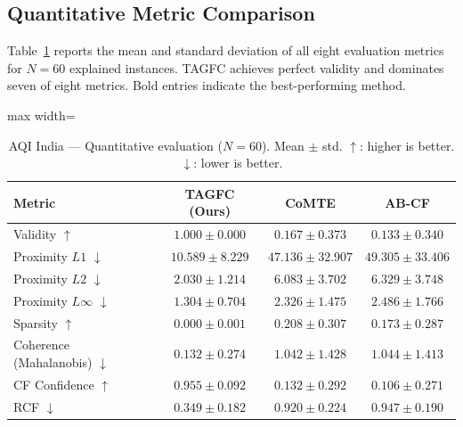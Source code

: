 \subsection{Quantitative Metric Comparison}

Table~\ref{tab:aqi_results} reports the mean and standard deviation of all eight evaluation metrics for $N=60$ explained instances. TAGFC achieves perfect validity and dominates seven of eight metrics. Bold entries indicate the best-performing method.

\begin{table}[htbp]
\centering
\caption{AQI India --- Quantitative evaluation ($N=60$). Mean $\pm$ std. $\uparrow$: higher is better. $\downarrow$: lower is better.}
\label{tab:aqi_results}
\begin{adjustbox}{max width=\textwidth}
\begin{tabular}{lccc}
\toprule
\textbf{Metric} & \textbf{TAGFC (Ours)} & \textbf{CoMTE} & \textbf{AB-CF} \\
\midrule
Validity $\uparrow$                        & $\mathbf{1.000 \pm 0.000}$ & $0.167 \pm 0.373$          & $0.133 \pm 0.340$          \\
Proximity $L1$ $\downarrow$                & $\mathbf{10.589 \pm 8.229}$ & $47.136 \pm 32.907$       & $49.305 \pm 33.406$        \\
Proximity $L2$ $\downarrow$                & $\mathbf{2.030 \pm 1.214}$  & $6.083 \pm 3.702$         & $6.329 \pm 3.748$          \\
Proximity $L\infty$ $\downarrow$           & $\mathbf{1.304 \pm 0.704}$  & $2.326 \pm 1.475$         & $2.486 \pm 1.766$          \\
Sparsity $\uparrow$                        & $0.000 \pm 0.001$           & $\mathbf{0.208 \pm 0.307}$ & $0.173 \pm 0.287$          \\
Coherence (Mahalanobis) $\downarrow$       & $\mathbf{0.132 \pm 0.274}$  & $1.042 \pm 1.428$         & $1.044 \pm 1.413$          \\
CF Confidence $\uparrow$                   & $\mathbf{0.955 \pm 0.092}$  & $0.132 \pm 0.292$         & $0.106 \pm 0.271$          \\
RCF $\downarrow$                           & $\mathbf{0.349 \pm 0.182}$  & $0.920 \pm 0.224$         & $0.947 \pm 0.190$          \\
\bottomrule
\end{tabular}
\end{adjustbox}
\end{table}

